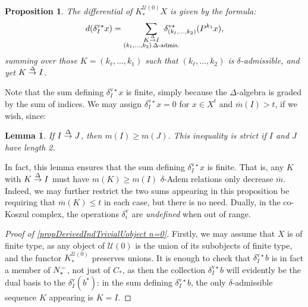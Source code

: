 \documentclass[11pt]{amsart} \renewcommand{\baselinestretch}{1.4}
\theoremstyle{plain}
\newtheorem{lem}[thm]{Lemma}
\newtheorem{prop}[thm]{Proposition}
\theoremstyle{definition}
\newcommand{\calU}{\mathcal{U}}
\newcommand{\deltaalg}{\Delta} %
\newcommand{\minDimP}{\overline{m}}
\newcommand{\minDimDelta}{m}
\newcommand{\produces}[3]{#3:#1\sim #2}
\renewcommand{\produces}[3]{#1\rightarrow_{#3} #2}%
\renewcommand{\produces}[3]{#1\overset{\smash{#3}}{\rightarrow} #2}%
\newcommand{\Nop}{N^{\smash{-}}}
\newcommand{\uver}{^\mathrm{v}}
\newcommand{\deltav}{\delta\uver}
\newcommand{\deltavstar}{\delta^{\mathrm{v}\star}}
\begin{document}
\begin{Koszul complexes}
\begin{prop}
The differential of $K^{\calU(0)}_*X$ is given by the formula:
\[d(\deltavstar_Ix)=\sum_{ \substack{\produces{K}{I}{\deltaalg}\\(k_{\ell},\ldots,k_2){\,\deltaalg\textup{-admis.}}}}\!\!\!\!\!\!\!\!\!\!\!\! \deltavstar_{(k_{\ell},\ldots,k_2)}(P^{k_1}x),\]
summing over those $K=(k_{\ell},\ldots,k_1)$ such that $(k_{\ell},\ldots,k_2)$ is $\delta$-admissible, and yet $\produces{K}{I}{\deltaalg}$.
\end{prop}
Note that the sum defining $\deltavstar_Ix$ is finite, simply because the $\Delta$-algebra is graded by the sum of indices.
We may assign $\deltavstar_Ix=0$ for $x\in X^t$ and $\minDimP(I)>t$, if we wish, since:
\begin{lem}
\label{lemOnAdemChangeIn minDimP}
If $\produces{I}{J}{\deltaalg}$, then $\minDimDelta(I)\geq\minDimDelta(J)$. This inequality is strict if $I$ and $J$ have length 2.
\end{lem}
\noindent In fact, this lemma ensures that the sum defining $\deltavstar_Ix$ is finite. That is, any $K$ with $\produces{K}{I}{\Delta}$ must have  $\minDimDelta(K)\geq\minDimDelta(I)$
 $\delta$-Adem relations only decrease $\minDimP$. Indeed, we may further restrict the two sums appearing in this proposition be requiring that $\minDimP(K)\leq t$ in each case, but there is no need. Dually, in the co-Koszul complex, the operations $\deltav_i$ are \emph{undefined} when out of range.
\begin{proof}[Proof of \ref{propDerivedIndTrivialUobject n=0}]
Firstly, we may assume that $X$ is  of finite type, as any object of $\calU(0)$ is the union of its  subobjects of finite type, and the functor $K_*^{\calU(0)}$ preserves unions. It is enough to check that $\deltavstar_Ib$ is in fact a member of $\Nop_*$, not just of $C_*$, as then the collection $\deltavstar_Ib$ will evidently be the dual basis to the $\deltav_I(b^*)$: in the sum defining $\deltavstar_Ib$, the only $\delta$-admissible sequence $K$ appearing is $K=I$.  %


\end{proof}
\end{Koszul complexes}
\end{document}
